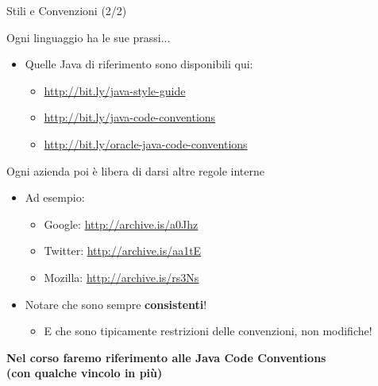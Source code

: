 \documentclass[presentation]{beamer}
\begin{document}
\begin{frame}{Stili e Convenzioni (2/2)}

\begin{block}{Ogni linguaggio ha le sue prassi...}
\begin{itemize}
		\item Quelle Java di riferimento sono disponibili qui:
		\tiny
		\begin{itemize}
			\item \url{http://bit.ly/java-style-guide}
			\item \url{http://bit.ly/java-code-conventions}
			\item \url{http://bit.ly/oracle-java-code-conventions}
		\end{itemize}
	\end{itemize}
\end{block}

\begin{block}{Ogni azienda poi è libera di darsi altre regole interne}

\begin{itemize}
\item Ad esempio:
\footnotesize
	\begin{itemize}
		\item Google: \url{http://archive.is/a0Jhz}
 		\item Twitter: \url{http://archive.is/aa1tE}
 		\item Mozilla: \url{http://archive.is/rs3Ns}
	\end{itemize}
	\normalsize
\item Notare che sono sempre \textbf{consistenti}!
\begin{itemize}
\item E che sono tipicamente restrizioni delle convenzioni, non modifiche!
\end{itemize}
\end{itemize}
\end{block}

\begin{center}
\textbf{Nel corso faremo riferimento alle Java Code Conventions\\(con qualche vincolo in più)}
\end{center}
\end{frame}
\end{document}

